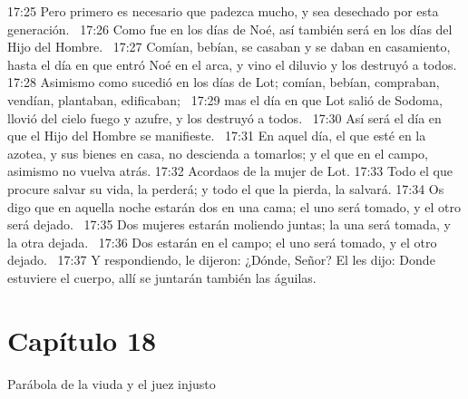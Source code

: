 17:25 Pero primero es necesario que padezca mucho, y sea desechado por esta generación.  
17:26 Como fue en los días de Noé, así también será en los días del Hijo del Hombre.  
17:27 Comían, bebían, se casaban y se daban en casamiento, hasta el día en que entró Noé en el arca, y vino el diluvio y los destruyó a todos. 
17:28 Asimismo como sucedió en los días de Lot; comían, bebían, compraban, vendían, plantaban, edificaban;  
17:29 mas el día en que Lot salió de Sodoma, llovió del cielo fuego y azufre, y los destruyó a todos.  
17:30 Así será el día en que el Hijo del Hombre se manifieste.  
17:31 En aquel día, el que esté en la azotea, y sus bienes en casa, no descienda a tomarlos; y el que en el campo, asimismo no vuelva atrás. 
17:32 Acordaos de la mujer de Lot. 
17:33 Todo el que procure salvar su vida, la perderá; y todo el que la pierda, la salvará. 
17:34 Os digo que en aquella noche estarán dos en una cama; el uno será tomado, y el otro será dejado.  
17:35 Dos mujeres estarán moliendo juntas; la una será tomada, y la otra dejada.  
17:36 Dos estarán en el campo; el uno será tomado, y el otro dejado.  
17:37 Y respondiendo, le dijeron: ¿Dónde, Señor? El les dijo: Donde estuviere el cuerpo, allí se juntarán también las águilas.  
\section*{Capítulo 18 }
Parábola de la viuda y el juez injusto  

